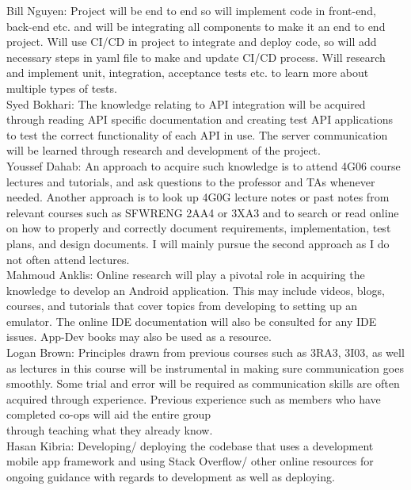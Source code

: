 \documentclass[12pt,letterpaper]{article}
\begin{document}
\noindent Bill Nguyen: Project will be end to end so will implement code in front-end, back-end etc. and will be integrating all components to make it an end to end project. Will use CI/CD in project to integrate and deploy code, so will add necessary steps in yaml file to make and update CI/CD process. Will research and implement unit, integration, acceptance tests etc. to learn more about multiple types of tests. \\

\noindent Syed Bokhari: The knowledge relating to API integration will be acquired through reading API specific documentation and creating test API applications to test the correct functionality of each API in use. The server communication will be learned through research and development of the project.\\

\noindent Youssef Dahab: An approach to acquire such knowledge is to attend 4G06 course lectures and tutorials, and ask questions to the professor and TAs whenever needed. Another approach is to look up 4G0G lecture notes or past notes from relevant courses such as SFWRENG 2AA4 or 3XA3 and to search or read online on how to properly and correctly document requirements, implementation, test plans, and design documents. I will mainly pursue the second approach as I do not often attend lectures.\\

\noindent Mahmoud Anklis: Online research will play a pivotal role in acquiring the knowledge to develop an Android application. This may include videos, blogs, courses, and tutorials that cover topics from developing to setting up an emulator. The online IDE documentation will also be consulted for any IDE issues. App-Dev books may also be used as a resource.\\

\noindent Logan Brown: Principles drawn from previous courses such as 3RA3, 3I03, as well as lectures in this course will be instrumental in making sure communication goes smoothly. Some trial and error will be required as communication skills are often acquired through experience. Previous experience such as members who have completed co-ops will aid the entire group\\ through teaching what they already know.\\

\noindent Hasan Kibria: Developing/ deploying the codebase that uses a development mobile app framework and using Stack Overflow/ other online resources for ongoing guidance with regards to development as well as deploying.\\
\end{document}
